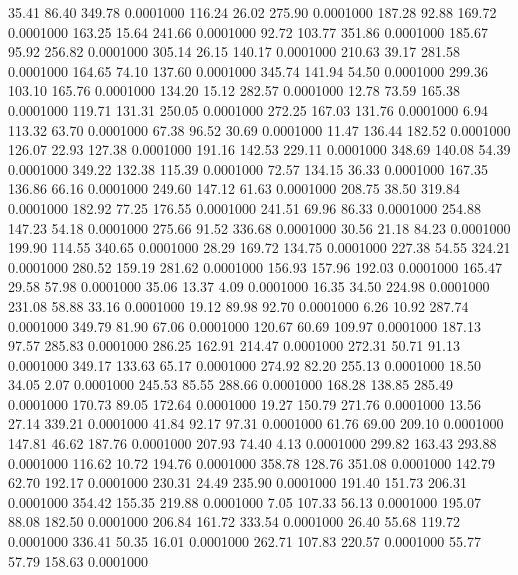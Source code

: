   35.41   86.40  349.78   0.0001000
 116.24   26.02  275.90   0.0001000
 187.28   92.88  169.72   0.0001000
 163.25   15.64  241.66   0.0001000
  92.72  103.77  351.86   0.0001000
 185.67   95.92  256.82   0.0001000
 305.14   26.15  140.17   0.0001000
 210.63   39.17  281.58   0.0001000
 164.65   74.10  137.60   0.0001000
 345.74  141.94   54.50   0.0001000
 299.36  103.10  165.76   0.0001000
 134.20   15.12  282.57   0.0001000
  12.78   73.59  165.38   0.0001000
 119.71  131.31  250.05   0.0001000
 272.25  167.03  131.76   0.0001000
   6.94  113.32   63.70   0.0001000
  67.38   96.52   30.69   0.0001000
  11.47  136.44  182.52   0.0001000
 126.07   22.93  127.38   0.0001000
 191.16  142.53  229.11   0.0001000
 348.69  140.08   54.39   0.0001000
 349.22  132.38  115.39   0.0001000
  72.57  134.15   36.33   0.0001000
 167.35  136.86   66.16   0.0001000
 249.60  147.12   61.63   0.0001000
 208.75   38.50  319.84   0.0001000
 182.92   77.25  176.55   0.0001000
 241.51   69.96   86.33   0.0001000
 254.88  147.23   54.18   0.0001000
 275.66   91.52  336.68   0.0001000
  30.56   21.18   84.23   0.0001000
 199.90  114.55  340.65   0.0001000
  28.29  169.72  134.75   0.0001000
 227.38   54.55  324.21   0.0001000
 280.52  159.19  281.62   0.0001000
 156.93  157.96  192.03   0.0001000
 165.47   29.58   57.98   0.0001000
  35.06   13.37    4.09   0.0001000
  16.35   34.50  224.98   0.0001000
 231.08   58.88   33.16   0.0001000
  19.12   89.98   92.70   0.0001000
   6.26   10.92  287.74   0.0001000
 349.79   81.90   67.06   0.0001000
 120.67   60.69  109.97   0.0001000
 187.13   97.57  285.83   0.0001000
 286.25  162.91  214.47   0.0001000
 272.31   50.71   91.13   0.0001000
 349.17  133.63   65.17   0.0001000
 274.92   82.20  255.13   0.0001000
  18.50   34.05    2.07   0.0001000
 245.53   85.55  288.66   0.0001000
 168.28  138.85  285.49   0.0001000
 170.73   89.05  172.64   0.0001000
  19.27  150.79  271.76   0.0001000
  13.56   27.14  339.21   0.0001000
  41.84   92.17   97.31   0.0001000
  61.76   69.00  209.10   0.0001000
 147.81   46.62  187.76   0.0001000
 207.93   74.40    4.13   0.0001000
 299.82  163.43  293.88   0.0001000
 116.62   10.72  194.76   0.0001000
 358.78  128.76  351.08   0.0001000
 142.79   62.70  192.17   0.0001000
 230.31   24.49  235.90   0.0001000
 191.40  151.73  206.31   0.0001000
 354.42  155.35  219.88   0.0001000
   7.05  107.33   56.13   0.0001000
 195.07   88.08  182.50   0.0001000
 206.84  161.72  333.54   0.0001000
  26.40   55.68  119.72   0.0001000
 336.41   50.35   16.01   0.0001000
 262.71  107.83  220.57   0.0001000
  55.77   57.79  158.63   0.0001000
